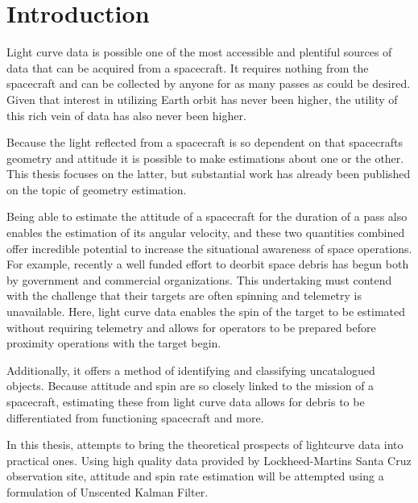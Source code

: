 \chapter{Introduction}

Light curve data is possible one of the most accessible and plentiful sources of data that can be acquired from a spacecraft. It requires nothing from the spacecraft and can be collected by anyone for as many passes as could be desired. Given that interest in utilizing Earth orbit has never been higher, the utility of this rich vein of data has also never been higher.

Because the light reflected from a spacecraft is so dependent on that spacecrafts geometry and attitude it is possible to make estimations about one or the other. This thesis focuses on the latter, but substantial work has already been published on the topic of geometry estimation.

Being able to estimate the attitude of a spacecraft for the duration of a pass also enables the estimation of its angular velocity, and these two quantities combined offer incredible potential to increase the situational awareness of space operations. For example, recently a well funded effort to deorbit space debris has begun both by government and commercial organizations. This undertaking must contend with the challenge that their targets are often spinning and telemetry is unavailable. Here, light curve data enables the spin of the target to be estimated without requiring telemetry and allows for operators to be prepared before proximity operations with the target begin.

Additionally, it offers a method of identifying and classifying uncatalogued objects. Because attitude and spin are so closely linked to the mission of a spacecraft, estimating these from light curve data allows for debris to be differentiated from functioning spacecraft and more.

In this thesis, attempts to bring the theoretical prospects of lightcurve data into practical ones. Using high quality data provided by Lockheed-Martins Santa Cruz observation site, attitude and spin rate estimation will be attempted using a formulation of Unscented Kalman Filter.